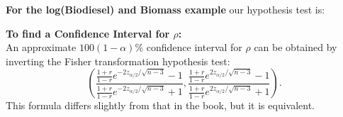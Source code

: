 \textbf{For the log(Biodiesel) and Biomass example} our hypothesis test is:\\

\newpage

\Large\textbf{To find a Confidence Interval for $\rho$:}\large\\
An approximate $100(1-\alpha)\%$ confidence interval for $\rho$ can be obtained by inverting the {Fisher transformation hypothesis test}:
$$ \left(\frac{\frac{1+r}{1-r}e^{-2z_{\alpha/2}/\sqrt{n-3}}-1}{\frac{1+r}{1-r}e^{-2z_{\alpha/2}/\sqrt{n-3}}+1}, \frac{\frac{1+r}{1-r}e^{2z_{\alpha/2}/\sqrt{n-3}}-1}{\frac{1+r}{1-r}e^{2z_{\alpha/2}/\sqrt{n-3}}+1}\right).$$
This formula differs slightly from that in the book, but it is equivalent.\\~\\~\\

